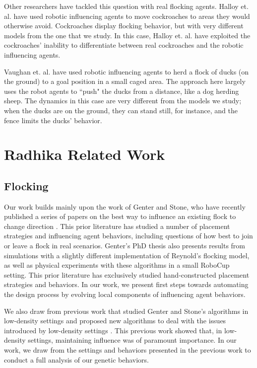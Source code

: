 Other researchers have tackled this question with real flocking agents.
Halloy et. al. \cite{Halloy2007} have used robotic influencing agents to move
cockroaches to areas they would otherwise avoid.
Cockroaches display flocking behavior, but with very different models from the
one that we study.
In this case, Halloy et. al. have exploited the cockroaches' inability to
differentiate between real cockroaches and the robotic influencing agents.

Vaughan et. al. \cite{vaughan98} have used robotic influencing agents to herd
a flock of ducks (on the ground) to a goal position in a small caged area.
The approach here largely uses the robot agents to ``push" the ducks from a
distance, like a dog herding sheep.
The dynamics in this case are very different from the models we study; when the
ducks are on the ground, they can stand still, for instance, and the fence
limits the ducks' behavior.

\section{Radhika Related Work}
\subsection{Flocking}
\label{sec:relatedflocking}
Our work builds mainly upon the work of Genter and Stone, who have recently
published a series of papers on the best way to influence an existing flock to
change direction \cite{genter2015placement, genter2014neighborsorientherd,
genter2013visionstationary, genter2013backsearch,
genter2016facegoalfacecurrent, genter201612steplookahead}.
This prior literature has studied a number of placement strategies and influencing
agent behaviors, including questions of how best to join or leave a flock in real
scenarios.
Genter's PhD thesis also presents results from simulations with a slightly
different implementation of Reynold's flocking model, as well as physical
experiments with these algorithms in a small RoboCup setting.
This prior literature has exclusively studied hand-constructed placement
strategies and behaviors.
In our work, we present first steps towards automating the design process by
evolving local components of influencing agent behaviors.

We also draw from previous work that studied Genter and Stone's algorithms in
low-density settings and proposed new algorithms to deal with the issues
introduced by low-density settings \cite{Fu2017}.
This previous work showed that, in low-density settings, maintaining influence
was of paramount importance.
In our work, we draw from the settings and behaviors presented in the previous
work to conduct a full analysis of our genetic behaviors.

